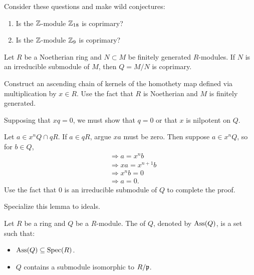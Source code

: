 \documentclass{ximera}
\begin{document}
\begin{exercise}
  Consider these questions and make wild conjectures:
  \begin{enumerate}
  \item Is the $\mathbb Z$-module $\mathbb Z_{18}$ is coprimary?
  \item Is the $\mathbb Z$-module $\mathbb Z_{9}$ is coprimary?
  \end{enumerate}
\end{exercise}


\begin{lemma}\label{L:irrcoprimary}
  Let $R$ be a Noetherian ring and $N\subset M$ be finitely generated
  $R$-modules. If $N$ is an irreducible submodule of $M$, then $Q=M/N$
  is coprimary.
  \begin{sketch}
    Construct an ascending chain of kernels of the homothety map
    defined via multiplication by $x\in R$. Use the fact that $R$ is
    Noetherian and $M$ is finitely generated.
    
    Supposing that $x q= 0$, we must show that $q= 0$ or that $x$ is
    nilpotent on $Q$.

    Let $a \in x^n Q \cap qR$. If $a\in qR$, argue $xa$ must be zero.
    Then suppose $a\in x^n Q$, so for $b\in Q$,
    \begin{align*}
      &\Rightarrow a = x^nb\\
      &\Rightarrow xa = x^{n+1}b\\
      &\Rightarrow x^n b = 0\\
      &\Rightarrow a=0.
    \end{align*}
    Use the fact that $0$ is an irreducible submodule of $Q$ to
    complete the proof.
  \end{sketch}
\end{lemma}


\begin{exercise}
  Specialize this lemma to ideals.
\end{exercise}



\begin{definition}
  Let $R$ be a ring and $Q$ be a $R$-module. The  of
  $Q$, denoted by $\operatorname{Ass}(Q)$, is a set such that:
  \begin{itemize}
  \item $\operatorname{Ass}(Q)\subseteq\operatorname{Spec}(R)$.
  \item $Q$ contains a submodule isomorphic to $R/\mathfrak{p}$.
  \end{itemize}
\end{definition}
\end{document}
